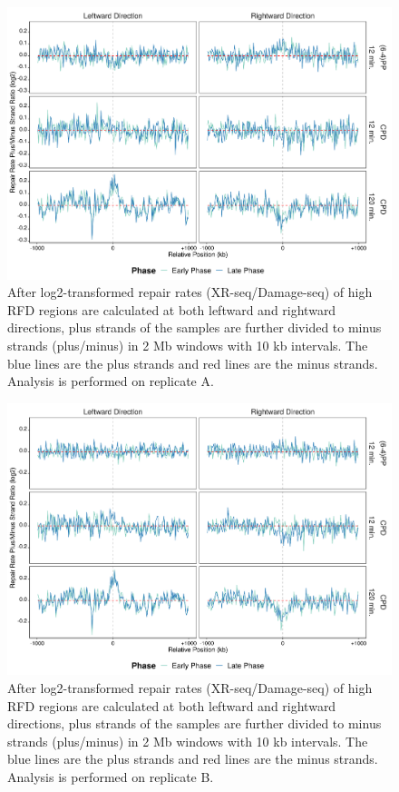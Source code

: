 \begin{figure}[H]
\begin{center}
\includegraphics[width=\textwidth]{Chapters/7_appendix/figures/supfig78}
\caption[Repair rate plus/minus ratio of high RFDs in 2 Mb (replicate A).]{After log2-transformed repair rates (XR-seq/Damage-seq) of high RFD regions are calculated at both leftward and rightward directions, plus strands of the samples are further divided to minus strands (plus/minus) in 2 Mb windows with 10 kb intervals. The blue lines are the plus strands and red lines are the minus strands. Analysis is performed on replicate A.}
\label{supfig:rrpm2000rfdA}
\end{center}
\end{figure}

\begin{figure}[H]
\begin{center}
\includegraphics[width=\textwidth]{Chapters/7_appendix/figures/supfig79}
\caption[Repair rate plus/minus ratio of high RFDs in 2 Mb (replicate B).]{After log2-transformed repair rates (XR-seq/Damage-seq) of high RFD regions are calculated at both leftward and rightward directions, plus strands of the samples are further divided to minus strands (plus/minus) in 2 Mb windows with 10 kb intervals. The blue lines are the plus strands and red lines are the minus strands. Analysis is performed on replicate B.}
\label{supfig:rrpm2000rfdB}
\end{center}
\end{figure}
